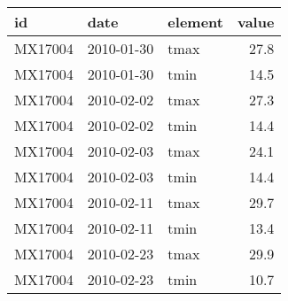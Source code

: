 \begin{tabular}{lllr}
  \toprule
 id & date & element & value \\ 
  \midrule
  MX17004 & 2010-01-30 & tmax & 27.8 \\ 
  MX17004 & 2010-01-30 & tmin & 14.5 \\ 
  MX17004 & 2010-02-02 & tmax & 27.3 \\ 
  MX17004 & 2010-02-02 & tmin & 14.4 \\ 
  MX17004 & 2010-02-03 & tmax & 24.1 \\ 
  MX17004 & 2010-02-03 & tmin & 14.4 \\ 
  MX17004 & 2010-02-11 & tmax & 29.7 \\ 
  MX17004 & 2010-02-11 & tmin & 13.4 \\ 
  MX17004 & 2010-02-23 & tmax & 29.9 \\ 
  MX17004 & 2010-02-23 & tmin & 10.7 \\ 
   \bottomrule
\end{tabular}
